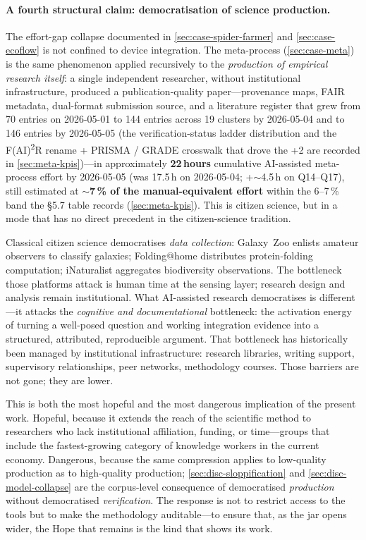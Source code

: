 \documentclass[11pt,a4paper]{article}
\begin{document}
\paragraph{A fourth structural claim: democratisation of science production.}
The effort-gap collapse documented in
\cref{sec:case-spider-farmer} and \cref{sec:case-ecoflow} is not
confined to device integration. The meta-process
(\cref{sec:case-meta}) is the same phenomenon applied recursively to
the \emph{production of empirical research itself}: a single
independent researcher, without institutional infrastructure,
produced a publication-quality paper---provenance maps, FAIR
metadata, dual-format submission source, and a literature register
that grew from 70 entries on 2026-05-01 to 144 entries across 19
clusters by 2026-05-04 and to 146 entries by 2026-05-05 (the
verification-status ladder distribution and the
F(AI)\textsuperscript{2}R rename + PRISMA / GRADE crosswalk that drove
the +2 are recorded in \cref{sec:meta-kpis})---in approximately
\textbf{22\,hours} cumulative AI-assisted meta-process effort by
2026-05-05 (was 17.5\,h on 2026-05-04; +$\sim$4.5\,h on Q14--Q17),
still estimated at \textbf{$\sim$7\,\% of the manual-equivalent
effort} within the 6--7\,\% band the
\S{}5.7 table records (\cref{sec:meta-kpis}). This is citizen science,
but in a mode that has no direct precedent in the citizen-science
tradition.

Classical citizen science democratises \emph{data collection}:
Galaxy~Zoo enlists amateur observers to classify galaxies;
Folding@home distributes protein-folding computation; iNaturalist
aggregates biodiversity observations. The bottleneck those platforms
attack is human time at the sensing layer; research design and
analysis remain institutional. What AI-assisted research
democratises is different---it attacks the \emph{cognitive and
documentational} bottleneck: the activation energy of turning a
well-posed question and working integration evidence into a
structured, attributed, reproducible argument. That bottleneck has
historically been managed by institutional infrastructure: research
libraries, writing support, supervisory relationships, peer networks,
methodology courses. Those barriers are not gone; they are lower.

This is both the most hopeful and the most dangerous implication of
the present work. Hopeful, because it extends the reach of the
scientific method to researchers who lack institutional affiliation,
funding, or time---groups that include the fastest-growing category
of knowledge workers in the current economy. Dangerous, because the
same compression applies to low-quality production as to high-quality
production; \cref{sec:disc-sloppification} and
\cref{sec:disc-model-collapse} are the corpus-level consequence of
democratised \emph{production} without democratised
\emph{verification}. The response is not to restrict access to the
tools but to make the methodology auditable---to ensure that, as the
jar opens wider, the Hope that remains is the kind that shows its
work.
\end{document}
